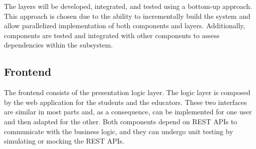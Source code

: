 \documentclass[12pt, a4paper]{report}
\begin{document}
    The layers will be developed, integrated, and tested using a bottom-up approach. 
    This approach is chosen due to the ability to incrementally build the system and allow parallelized implementation of both components and layers. 
    Additionally, components are tested and integrated with other components to assess dependencies within the subsystem.

    \subsection{Frontend}
    The frontend consists of the presentation logic layer. 
    The logic layer is composed by the web application for the students and the educators. 
    These two interfaces are similar in most parts and, as a consequence, can be implemented for one user and then adapted for the other. 
    Both components depend on REST APIs to communicate with the business logic, and they can undergo unit testing by simulating or mocking the REST APIs.
\end{document}
